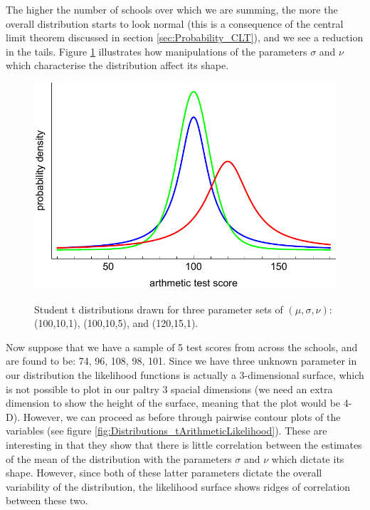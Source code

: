 \documentclass[11pt,fullpage]{book}
\begin{document}
The higher the number of schools over which we are summing, the more the overall distribution starts to look normal (this is a consequence of the central limit theorem discussed in section \ref{sec:Probability_CLT}), and we see a reduction in the tails. Figure \ref{fig:Distributions_tArithmeticExposition} illustrates how manipulations of the parameters $\sigma$ and $\nu$ which characterise the distribution affect its shape.

\begin{figure}
\centering
\scalebox{0.5} 
{\includegraphics{Distributions_tArithmeticExposition.pdf}}
\caption{Student t distributions drawn for three parameter sets of $(\mu,\sigma,\nu)$: (100,10,1), (100,10,5), and (120,15,1).}\label{fig:Distributions_tArithmeticExposition}
\end{figure}

Now suppose that we have a sample of 5 test scores from across the schools, and are found to be: {74, 96, 108, 98, 101}. Since we have three unknown parameter in our distribution the likelihood functions is actually a 3-dimensional surface, which is not possible to plot in our paltry 3 spacial dimensions (we need an extra dimension to show the height of the surface, meaning that the plot would be 4-D). However, we can proceed as before through pairwise contour plots of the variables (see figure \ref{fig:Distributions_tArithmeticLikelihood}). These are interesting in that they show that there is little correlation between the estimates of the mean of the distribution with the parameters $\sigma$ and $\nu$ which dictate its shape. However, since both of these latter parameters dictate the overall variability of the distribution, the likelihood surface shows ridges of correlation between these two.
\end{document}
